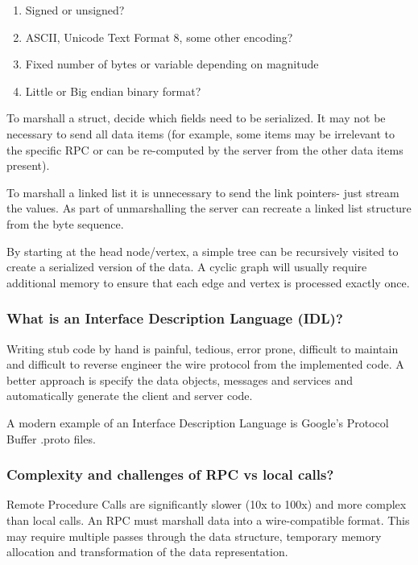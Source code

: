 \documentclass[]{article}
\begin{document}
\begin{enumerate}
\item
  Signed or unsigned?
\item
  ASCII, Unicode Text Format 8, some other encoding?
\item
  Fixed number of bytes or variable depending on magnitude
\item
  Little or Big endian binary format?
\end{enumerate}

To marshall a struct, decide which fields need to be serialized. It may
not be necessary to send all data items (for example, some items may be
irrelevant to the specific RPC or can be re-computed by the server from
the other data items present).

To marshall a linked list it is unnecessary to send the link pointers-
just stream the values. As part of unmarshalling the server can recreate
a linked list structure from the byte sequence.

By starting at the head node/vertex, a simple tree can be recursively
visited to create a serialized version of the data. A cyclic graph will
usually require additional memory to ensure that each edge and vertex is
processed exactly once.

\subsubsection{What is an Interface Description Language
(IDL)?}\label{what-is-an-interface-description-language-idl}

Writing stub code by hand is painful, tedious, error prone, difficult to
maintain and difficult to reverse engineer the wire protocol from the
implemented code. A better approach is specify the data objects,
messages and services and automatically generate the client and server
code.

A modern example of an Interface Description Language is Google's
Protocol Buffer .proto files.

\subsubsection{Complexity and challenges of RPC vs local
calls?}\label{complexity-and-challenges-of-rpc-vs-local-calls}

Remote Procedure Calls are significantly slower (10x to 100x) and more
complex than local calls. An RPC must marshall data into a
wire-compatible format. This may require multiple passes through the
data structure, temporary memory allocation and transformation of the
data representation.
\end{document}

